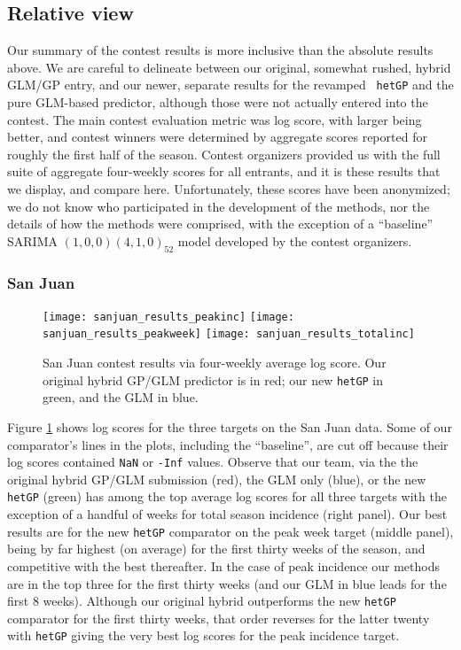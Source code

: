 \documentclass[12pt]{article}
\begin{document}
\subsection{Relative view}

Our summary of the contest results is more inclusive than the absolute results
above. We are careful to delineate between our original, somewhat rushed,
hybrid GLM/GP entry, and our newer, separate results for the revamped {\tt
hetGP} and the pure GLM-based predictor, although those were not actually
entered into the contest. The main contest evaluation metric was log score,
with larger being better, and contest winners were determined by aggregate
scores reported for roughly the first half of the season.  Contest organizers
provided us with the full suite of aggregate four-weekly scores for all
entrants, and it is these results that we display, and compare here.
Unfortunately, these scores have been anonymized; we do not know who
participated in the development of the methods, nor the details of how the
methods were comprised, with the exception of a ``baseline'' SARIMA
$(1,0,0)(4,1,0)_{52}$ model developed by the contest organizers.


\subsubsection*{San Juan}

\begin{figure}[ht!]
\centering
\texttt{[image: sanjuan\_results\_peakinc]}
\texttt{[image: sanjuan\_results\_peakweek]}
\texttt{[image: sanjuan\_results\_totalinc]}
\caption{San Juan contest results via four-weekly average log score.  Our
original hybrid GP/GLM predictor is in red; our new {\tt hetGP} in green, and the GLM in blue.}
\label{f:sjresults}
\end{figure}

Figure \ref{f:sjresults} shows log scores for the three targets on the San
Juan data.  Some of our comparator's lines in the plots, including the
``baseline'', are cut off because their log scores contained \verb!NaN! or
\verb!-Inf! values. Observe that our team, via the the original hybrid
GP/GLM submission (red), the GLM only (blue), or the new {\tt hetGP} (green)
has among the top average log scores for all three targets with the exception
of a handful of weeks for total season incidence (right panel).  Our best
results are for the new {\tt hetGP} comparator on the peak week target (middle
panel), being by far highest (on average) for the first thirty weeks of the
season, and competitive with the best thereafter.  In the case of peak
incidence our methods are in the top three for the first thirty weeks (and our
GLM in blue leads for the first 8 weeks).  Although our original hybrid
outperforms the new {\tt hetGP} comparator for the first thirty weeks, that
order reverses for the latter twenty with {\tt hetGP} giving the very best log
scores for the peak incidence target.
\end{document}
